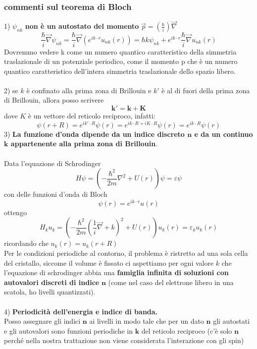 \subsubsection{commenti sul teorema di Bloch}
1) $\psi_{nk}$ \textbf{non è un autostato del momento} $\vec{p} = (\frac{\hbar}{i})\vec{\nabla}$ 
\begin{equation*}
\frac{\hbar}{i} \vec{\nabla} \psi_{nk} = \frac{\hbar}{i} \vec{\nabla}(e^{i k \cdot r} u_{nk}(r)) = \hbar k \psi_{nk} + e^{i k\cdot r} \frac{\hbar}{i} \vec{\nabla} u_{nk}(r)
\end{equation*}
Dovremmo vedere k come un numero quantico caratteristico della simmetria traslazionale di un potenziale periodico, come il momento p che è un numero quantico caratteristico dell'intera simmetria traslazionale dello spazio libero. \\\\
2) se $k$ è confinato alla prima zona di Brillouin e $k'$ è al di fuori della prima zona di Brillouin, allora posso scrivere 
\[\mathbf{k' = k + K}\]
dove $K$ è un vettore del reticolo reciproco, infatti: 
\[ \psi(r + R) = e^{ik' \cdot R}\psi(r) = e^{i k \cdot R + iK \cdot R} \psi(r) = e^{i k \cdot R}\psi(r) \]
3) \textbf{La funzione d'onda dipende da un indice discreto $\mathbf{n}$ e da un continuo $\mathbf{k}$ appartenente alla prima zona di Brillouin}.\\\\
Data l'equazione di Schrodinger 
\[ H\psi = \left( -\frac{\hbar^2}{2m}\nabla^2 + U(r) \right) \psi = \varepsilon \psi \]
con delle funzioni d'onda di Bloch 
\[ \psi(r) = e^{i k \cdot r} u(r) \]
ottengo 
\[ H_k u_k = \left( -\frac{\hbar^2}{2m} \left( \frac{1}{i}\vec{\nabla} + k \right)^2 + U(r) \right) u_k(r) = \varepsilon_k u_k(r) \]
ricordando che $u_k(r) = u_k(r+R)$ \\
Per le condizioni periodiche al contorno, il problema è ristretto ad una sola cella del cristallo, siccome il volume è fissato ci aspettiamo per ogni valore $k$ che l'equazione di schrodinger abbia una \textbf{famiglia infinita di soluzioni con autovalori discreti di indice} $\mathbf{n}$ (come nel caso del elettrone libero in una scatola, ho livelli quantizzati).\\\\
4) \textbf{Periodicità dell'energia e indice di banda.}\\
Posso assegnare gli indici $\mathbf{n}$ ai livelli in modo tale che per un dato $\mathbf{n}$ gli autostati e gli autovalori sono funzioni periodiche in $\mathbf{k}$ del reticolo reciproco (c'è solo $\mathbf{n}$ perché nella nostra trattazione non viene considerata l'interazione con gli spin)
